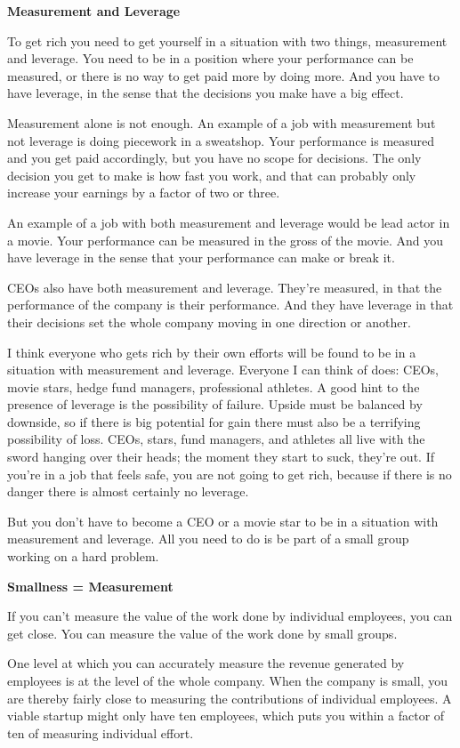 \documentclass[12pt]{book}
\begin{document}
\textbf{Measurement and Leverage}

To get rich you need to get yourself in a situation with two things,
measurement and leverage. You need to be in a position where your
performance can be measured, or there is no way to get paid more by
doing more. And you have to have leverage, in the sense that the
decisions you make have a big effect.

Measurement alone is not enough. An example of a job with measurement
but not leverage is doing piecework in a sweatshop. Your performance is
measured and you get paid accordingly, but you have no scope for
decisions. The only decision you get to make is how fast you work, and
that can probably only increase your earnings by a factor of two or
three.

An example of a job with both measurement and leverage would be lead
actor in a movie. Your performance can be measured in the gross of the
movie. And you have leverage in the sense that your performance can make
or break it.

CEOs also have both measurement and leverage. They're measured, in that
the performance of the company is their performance. And they have
leverage in that their decisions set the whole company moving in one
direction or another.

I think everyone who gets rich by their own efforts will be found to be
in a situation with measurement and leverage. Everyone I can think of
does: CEOs, movie stars, hedge fund managers, professional athletes. A
good hint to the presence of leverage is the possibility of failure.
Upside must be balanced by downside, so if there is big potential for
gain there must also be a terrifying possibility of loss. CEOs, stars,
fund managers, and athletes all live with the sword hanging over their
heads; the moment they start to suck, they're out. If you're in a job
that feels safe, you are not going to get rich, because if there is no
danger there is almost certainly no leverage.

But you don't have to become a CEO or a movie star to be in a situation
with measurement and leverage. All you need to do is be part of a small
group working on a hard problem.

\textbf{Smallness = Measurement}

If you can't measure the value of the work done by individual employees,
you can get close. You can measure the value of the work done by small
groups.

One level at which you can accurately measure the revenue generated by
employees is at the level of the whole company. When the company is
small, you are thereby fairly close to measuring the contributions of
individual employees. A viable startup might only have ten employees,
which puts you within a factor of ten of measuring individual effort.
\end{document}
